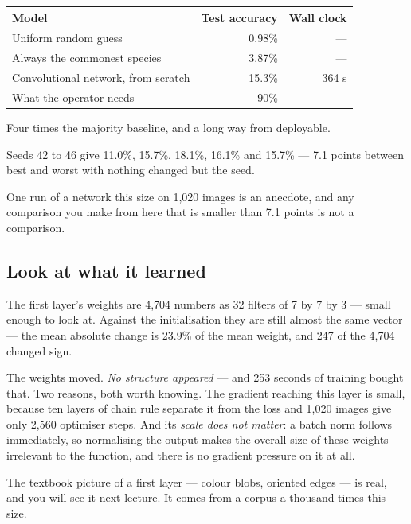 \documentclass[11pt,a4paper]{article}
\begin{document}
\begin{center}
\small
\begin{tabular}{lrr}
\toprule
\textbf{Model} & \textbf{Test accuracy} & \textbf{Wall clock} \\
\midrule
Uniform random guess & 0.98\% & --- \\
Always the commonest species & 3.87\% & --- \\
Convolutional network, from scratch & 15.3\% & 364 s \\
\midrule
What the operator needs & 90\% & --- \\
\bottomrule
\end{tabular}
\end{center}

Four times the majority baseline, and a long way from deployable.

\begin{keybox}[title={Why five runs and not one}]
Seeds 42 to 46 give 11.0\%, 15.7\%, 18.1\%, 16.1\% and 15.7\% --- 7.1 points
between best and worst with nothing changed but the seed.

One run of a network this size on 1{,}020 images is an anecdote, and any
comparison you make from here that is smaller than 7.1 points is not a
comparison.
\end{keybox}

\subsection{Look at what it learned}

The first layer's weights are 4{,}704 numbers as 32 filters of 7 by 7 by 3 ---
small enough to look at. Against the initialisation they are still almost the
same vector --- the mean absolute change is 23.9\% of the mean weight, and 247
of the 4{,}704 changed sign.

The weights moved. \emph{No structure appeared} --- and 253 seconds of training
bought that. Two reasons, both worth knowing. The gradient reaching this layer
is small, because ten layers of chain rule separate it from the loss and 1{,}020
images give only 2{,}560 optimiser steps. And its \emph{scale does not matter}:
a batch norm follows immediately, so normalising the output makes the overall
size of these weights irrelevant to the function, and there is no gradient
pressure on it at all.

The textbook picture of a first layer --- colour blobs, oriented edges --- is
real, and you will see it next lecture. It comes from a corpus a thousand times
this size.
\end{document}
